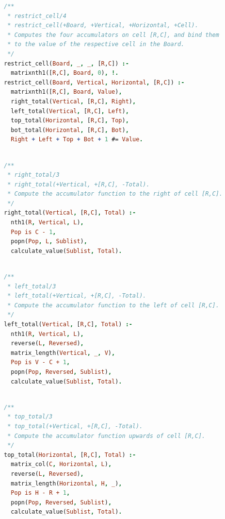 \documentclass[runningheads]{llncs}
\begin{document}
\begin{center}
\begin{minipage}{0.85\textwidth}
\centering\ttfamily
\begin{lstlisting}[language=Prolog]
/**
 * restrict_cell/4
 * restrict_cell(+Board, +Vertical, +Horizontal, +Cell).
 * Computes the four accumulators on cell [R,C], and bind them
 * to the value of the respective cell in the Board.
 */
restrict_cell(Board, _, _, [R,C]) :-
  matrixnth1([R,C], Board, 0), !.
restrict_cell(Board, Vertical, Horizontal, [R,C]) :-
  matrixnth1([R,C], Board, Value),
  right_total(Vertical, [R,C], Right),
  left_total(Vertical, [R,C], Left),
  top_total(Horizontal, [R,C], Top),
  bot_total(Horizontal, [R,C], Bot),
  Right + Left + Top + Bot + 1 #= Value.
  
\end{lstlisting}
\end{minipage}
\end{center}

\begin{center}
\begin{minipage}{0.85\textwidth}
\centering\ttfamily
\begin{lstlisting}[language=Prolog]
/**
 * right_total/3
 * right_total(+Vertical, +[R,C], -Total).
 * Compute the accumulator function to the right of cell [R,C].
 */
right_total(Vertical, [R,C], Total) :-
  nth1(R, Vertical, L),
  Pop is C - 1,
  popn(Pop, L, Sublist),
  calculate_value(Sublist, Total).
  
\end{lstlisting}
\end{minipage}
\end{center}

\begin{center}
\begin{minipage}{0.85\textwidth}
\centering\ttfamily
\begin{lstlisting}[language=Prolog]
/**
 * left_total/3
 * left_total(+Vertical, +[R,C], -Total).
 * Compute the accumulator function to the left of cell [R,C].
 */
left_total(Vertical, [R,C], Total) :-
  nth1(R, Vertical, L),
  reverse(L, Reversed),
  matrix_length(Vertical, _, V),
  Pop is V - C + 1,
  popn(Pop, Reversed, Sublist),
  calculate_value(Sublist, Total).
  
\end{lstlisting}
\end{minipage}
\end{center}

\begin{center}
\begin{minipage}{0.85\textwidth}
\centering\ttfamily
\begin{lstlisting}[language=Prolog]
/**
 * top_total/3
 * top_total(+Vertical, +[R,C], -Total).
 * Compute the accumulator function upwards of cell [R,C].
 */
top_total(Horizontal, [R,C], Total) :-
  matrix_col(C, Horizontal, L),
  reverse(L, Reversed),
  matrix_length(Horizontal, H, _),
  Pop is H - R + 1,
  popn(Pop, Reversed, Sublist),
  calculate_value(Sublist, Total).
  
\end{lstlisting}
\end{minipage}
\end{center}
\end{document}

